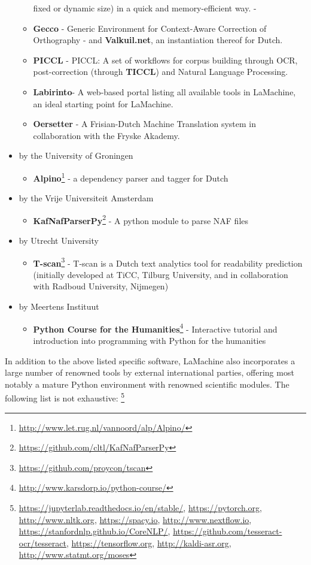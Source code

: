 \documentclass[a4paper,11pt]{article}
\begin{document}
\begin{itemize}
\begin{itemize}
         fixed or dynamic size) in a quick and memory-efficient way. -
     \item \textbf{Gecco} - Generic Environment for Context-Aware Correction of Orthography - and \textbf{Valkuil.net},
         an instantiation thereof for Dutch.
     \item \textbf{PICCL} - PICCL: A set of workflows for corpus building through OCR, post-correction (through \textbf{TICCL}) and Natural Language Processing.
     \item \textbf{Labirinto}- A web-based portal listing all
         available tools in LaMachine, an ideal starting point for LaMachine.
     \item \textbf{Oersetter} - A Frisian-Dutch Machine Translation system in collaboration with the Fryske Akademy.
 \end{itemize}
 \item by the University of Groningen
 \begin{itemize}
     \item \textbf{Alpino}\footnote{\url{http://www.let.rug.nl/vannoord/alp/Alpino/}} - a dependency parser and tagger for Dutch
 \end{itemize}
 \item by the Vrije Universiteit Amsterdam
 \begin{itemize}
     \item \textbf{KafNafParserPy}\footnote{\url{https://github.com/cltl/KafNafParserPy}} - A python module to parse NAF files
 \end{itemize}
 \item by Utrecht University
 \begin{itemize}
     \item  \textbf{T-scan}\footnote{\url{https://github.com/proycon/tscan}} - T-scan is a Dutch text analytics tool for readability prediction (initially developed at TiCC, Tilburg University, and in collaboration with Radboud University, Nijmegen)
 \end{itemize}
 \item by Meertens Instituut
 \begin{itemize}
     \item \textbf{Python Course for the Humanities}\footnote{\url{http://www.karsdorp.io/python-course/}} - Interactive
         tutorial and introduction into programming with Python for the humanities
 \end{itemize}
\end{itemize}

In addition to the above listed specific software, LaMachine also incorporates a large number of renowned tools by external international parties, offering
most notably a mature Python environment with renowned scientific modules. The following list is not
exhaustive: \footnote{\url{https://jupyterlab.readthedocs.io/en/stable/}, \url{https://pytorch.org}, \url{http://www.nltk.org},
    \url{https://spacy.io},  \url{http://www.nextflow.io}, \url{https://stanfordnlp.github.io/CoreNLP/},  \url{https://github.com/tesseract-ocr/tesseract}, \url{https://tensorflow.org},
\url{http://kaldi-asr.org}, \url{http://www.statmt.org/moses}}
\end{document}
